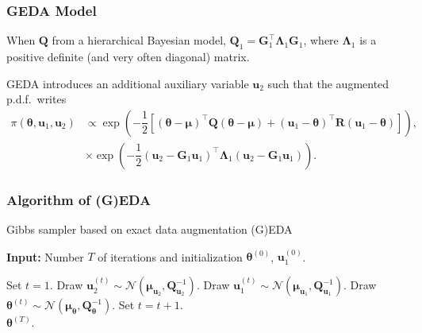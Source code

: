 \documentclass[aspectratio=169]{beamer}
\newcommand{\B}[1]{\mathbf{#1}} %
\newcommand{\Bs}[1]{\boldsymbol{#1}} %
\newcommand{\pr}[1]{\left(#1\right)} %
\newcommand{\br}[1]{\left[#1\right]} %
\begin{document}
\begin{frame}
  \frametitle{GEDA Model}
When $\B{Q}$ from a hierarchical Bayesian model, $\B{Q}_1 = \B{G}_1^{\top}\Bs{\Lambda}_1\B{G}_1$, where $\Bs{\Lambda}_1$ is a positive definite (and very often diagonal) matrix.
  
GEDA introduces an additional auxiliary variable $\B{u}_2$ such that the augmented p.d.f.\ writes
\[
  \begin{aligned}
    \pi(\Bs{\theta},\B{u}_1,\B{u}_2) &\propto \exp\pr{-\dfrac{1}{2}\br{(\Bs{\theta}-\Bs{\mu})^{\top}\B{Q}(\Bs{\theta}-\Bs{\mu}) + (\B{u}_1-\Bs{\theta})^{\top}\B{R}(\B{u}_1-\Bs{\theta})}}, \\
    &\times \exp\pr{-\dfrac{1}{2}(\B{u}_2-\B{G}_1\B{u}_1)^{\top}\B{\Lambda}_1(\B{u}_2-\B{G}_1\B{u}_1)}.
  \end{aligned}
\]
\end{frame}

\begin{frame}
\frametitle{Algorithm of (G)EDA}
\begin{algorithm}[H]
\caption{Gibbs sampler based on exact data augmentation (G)EDA}
\label{algo:exact_DA}
\hspace*{\algorithmicindent} \textbf{Input:} Number $T$ of iterations and initialization $\Bs{\theta}^{(0)}$, $\B{u}_1^{(0)}$.
\begin{algorithmic}[1]
\State Set $t = 1$.
\State Draw $\B{u}_2^{(t)} \sim \mathcal{N}(\Bs{\mu}_{\B{u}_2},\B{Q}_{\B{u}_2}^{-1})$. \Comment{\textcolor{blue}{Only if GEDA is considered.}}
\State Draw $\B{u}_1^{(t)} \sim \mathcal{N}(\Bs{\mu}_{\B{u}_1},\B{Q}_{\B{u}_1}^{-1})$.
\State Draw $\Bs{\theta}^{(t)} \sim \mathcal{N}(\Bs{\mu}_{\Bs{\theta}},\B{Q}_{\Bs{\theta}}^{-1})$.
\State Set $t = t + 1$.
\EndWhile\\
\Return $\Bs{\theta}^{(T)}$.
\end{algorithmic}
\end{algorithm}
\end{frame}
\end{document}
